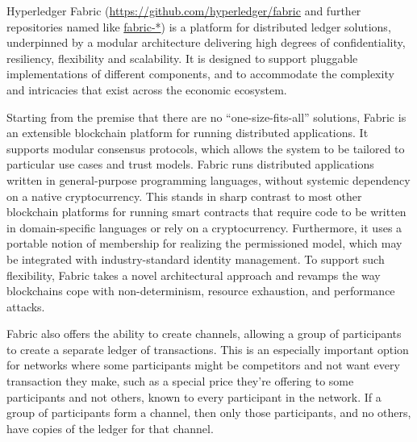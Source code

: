 Hyperledger Fabric (\url{https://github.com/hyperledger/fabric} and further repositories named like \url{fabric-*}) is a platform for distributed ledger solutions, underpinned by a modular architecture delivering high degrees of confidentiality, resiliency, flexibility and scalability. It is designed to support pluggable implementations of different components, and to accommodate the complexity and intricacies that exist across the economic ecosystem.

Starting from the premise that there are no ``one-size-fits-all'' solutions, Fabric is an extensible blockchain platform for running distributed applications.  It supports modular consensus protocols, which allows the system to be tailored to particular use cases and trust models. Fabric runs distributed applications written in general-purpose programming languages, without systemic dependency on a native cryptocurrency.  This stands in sharp contrast to most other blockchain platforms for running smart contracts that require code to be written in domain-specific languages or rely on a cryptocurrency.  Furthermore, it uses a portable notion of membership for realizing the permissioned model, which may be integrated with industry-standard identity management.  To support such flexibility, Fabric takes a novel architectural approach and revamps the way blockchains cope with non-determinism, resource exhaustion, and performance attacks.


Fabric also offers the ability to create channels, allowing a group of participants to create a separate ledger of transactions. This is an especially important option for networks where some participants might be competitors and not want every transaction they make, such as a special price they’re offering to some participants and not others, known to every participant in the network. If a group of participants form a channel, then only those participants, and no others, have copies of the ledger for that channel.


